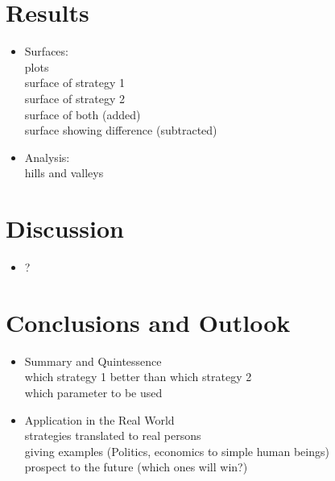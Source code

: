 \documentclass{article}
\begin{document}
\section{Results}
\begin{itemize}

	\item Surfaces:\\
		plots\\
		surface of strategy 1\\
		surface of strategy 2\\
		surface of both (added)\\
		surface showing difference (subtracted)\\

	\item Analysis:\\
		hills and valleys\\

\end{itemize}

\section{Discussion}
\begin{itemize}

	\item ?

\end{itemize}

\section{Conclusions and Outlook}
\begin{itemize}

	\item Summary and Quintessence\\
		which strategy 1 better than which strategy 2\\
		which parameter to be used\\

	\item Application in the Real World\\
		strategies translated to real persons\\
		giving examples (Politics, economics to simple human beings)\\
		prospect to the future (which ones will win?)

\end{itemize}
\end{document}
